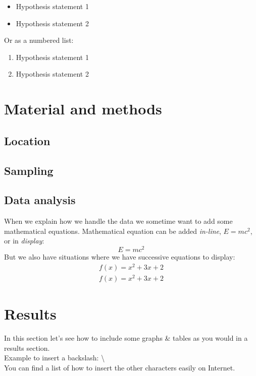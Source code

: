 \documentclass[11pt, a4paper]{article}
\begin{document}
\begin{itemize}
	\item Hypothesis statement 1
	\item Hypothesis statement 2
\end{itemize}

Or as a numbered list:
\begin{enumerate}
  \item Hypothesis statement 1
  \item Hypothesis statement 2
\end{enumerate}

\section{Material and methods}
\subsection{Location}
\subsection{Sampling}
\subsection{Data analysis}

When we explain how we handle the data we sometime want to add some mathematical equations. Mathematical equation can be added \textit{in-line}, \begin{math}E=mc^2\end{math}, or in \textit{display}:
\begin{equation} %
E=mc^2
\end{equation}
But we also have situations where we have successive equations to display:
\begin{align*} %
f(x) = x^2+3x+2\\ 
f(x) = x^2+3x+2 
\end{align*}

\section{Results}

In this section let's see how to include some graphs \& tables as you would in a results section.\\ 
Example to insert a backslash: \textbackslash\\ %
You can find a list of how to insert the other characters easily on Internet.
\end{document}
